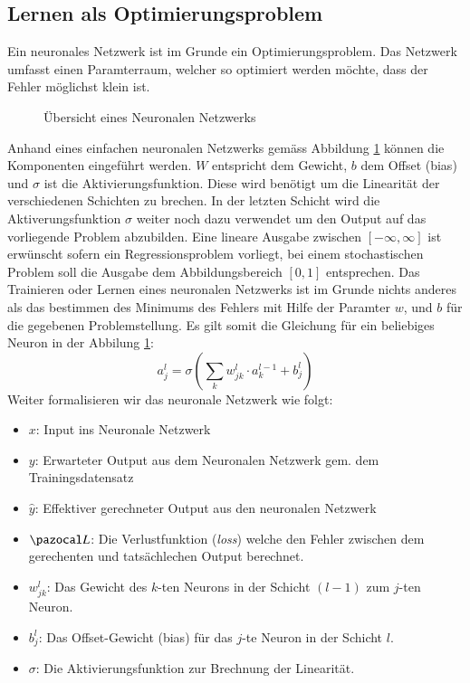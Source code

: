 \subsection{Lernen als Optimierungsproblem}
Ein neuronales Netzwerk ist im Grunde ein Optimierungsproblem. Das Netzwerk umfasst einen Paramterraum, welcher so optimiert werden möchte, dass der Fehler möglichst klein ist. 
\begin{figure}
	\begin{center}
		
		\caption{Übersicht eines Neuronalen Netzwerks}
		\label{ableitung:fig:neuronal_network}
	\end{center}
\end{figure} 
Anhand eines einfachen neuronalen Netzwerks gemäss Abbildung \ref{ableitung:fig:neuronal_network} können die Komponenten eingeführt werden. $W$ entspricht dem Gewicht, $b$ dem Offset (bias) und $\sigma$ ist die Aktivierungsfunktion. Diese wird benötigt um die Linearität der verschiedenen Schichten zu brechen. In der letzten Schicht wird die Aktiverungsfunktion $\sigma$ weiter noch dazu verwendet um den Output auf das vorliegende Problem abzubilden. Eine lineare Ausgabe zwischen $[-\infty, \infty]$ ist erwünscht sofern ein Regressionsproblem vorliegt, bei einem stochastischen Problem soll die Ausgabe dem Abbildungsbereich $[0, 1]$ entsprechen. Das Trainieren oder Lernen eines neuronalen Netzwerks ist im Grunde nichts anderes als das bestimmen des Minimums des Fehlers mit Hilfe der Paramter $w$, und $b$ für die gegebenen Problemstellung. Es gilt somit die Gleichung für ein beliebiges Neuron in der Abbilung \ref{ableitung:fig:neuronal_network}:
\begin{equation}
a^{l}_{j} = \sigma \left( \sum\limits_{k}w^{l}_{jk} \cdot a^{l-1}_{k}+b^{l}_{j} \right)
\label{ableitung:eqn:simple_neuron_eqn}
\end{equation}
Weiter formalisieren wir das neuronale Netzwerk wie folgt:
\begin{itemize}
	\item{$x$: Input ins Neuronale Netzwerk}
	\item{$y$: Erwarteter Output aus dem Neuronalen Netzwerk gem. dem Trainingsdatensatz}
	\item{$\hat{y}$: Effektiver gerechneter Output aus den neuronalen Netzwerk}
	\item{$\Lb$: Die Verlustfunktion (\textit{loss}) welche den Fehler zwischen dem gerechenten und tatsächlechen Output berechnet.}
	\item{$w_{jk}^{l}$: Das Gewicht des $k$-ten Neurons in der Schicht $(l-1)$ zum $j$-ten Neuron.}
	\item{$b_{j}^{l}$: Das Offset-Gewicht (bias) für das $j$-te Neuron in der Schicht $l$.}
	\item{$\sigma$: Die Aktivierungsfunktion zur Brechnung der Linearität.}
\end{itemize}
